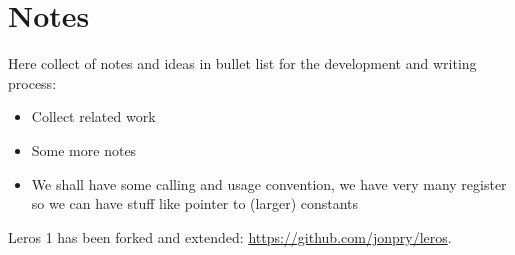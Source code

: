 \documentclass[a4paper,fontsize=10pt,twoside,DIV15,BCOR12mm,headinclude=true,footinclude=false,pagesize,bibtotoc]{scrbook}
\begin{document}
\section{Notes}

Here collect of notes and ideas in bullet list for the development and writing process:

\begin{itemize}
\item Collect related work
\item Some more notes
\item We shall have some calling and usage convention, we have very many register so we can have
stuff like pointer to (larger) constants
\end{itemize}

Leros 1 has been forked and extended: \url{https://github.com/jonpry/leros}.
\end{document}
